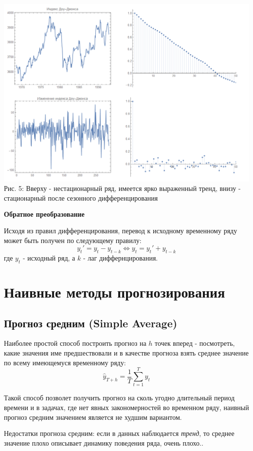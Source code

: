 \documentclass[aps,%
12pt,%
final,%
oneside,
onecolumn,%
musixtex, %
superscriptaddress,%
centertags]{article} %
\theoremstyle{plain}
\theoremstyle{definition}
\theoremstyle{remark}
\begin{document}
\begin{center}
	\includegraphics[scale=0.37]{images/4.png}
	Рис. 5: Вверху - нестационарный ряд, имеется ярко выраженный тренд, внизу - стационарный после сезонного дифференцирования
\end{center}

\textbf{Обратное преобразование}

Исходя из правил дифференцирования, перевод к исходному временному ряду может быть получен по следующему правилу:
$$y_t' = y_t - y_{t-k} \Leftrightarrow y_t = y_t'+y_{t-k}$$
где $y_t$ - исходный ряд, а $k$ - лаг диффернцирования.


\newpage
\section{Наивные методы прогнозирования}

\subsection{Прогноз средним (Simple Average)}

Наиболее простой способ построить прогноз на $h$ точек вперед - посмотреть, какие значения име предшествовали и в качестве прогноза взять среднее значение по всему имеющемуся временному ряду:
$$\hat{y}_{T+h} = \frac{1}{T} \sum\limits_{t=1}^T y_t$$

Такой способ позволет получить прогноз на сколь угодно длительный период времени и в задачах, где нет явных закономерностей во временном ряду, наивный прогноз средним значением является не худшим вариантом.

Недостатки прогноза средним: если в данных наблюдается \textit{тренд}, то среднее значение плохо описывает динамику поведения ряда, очень плохо..
\end{document}
